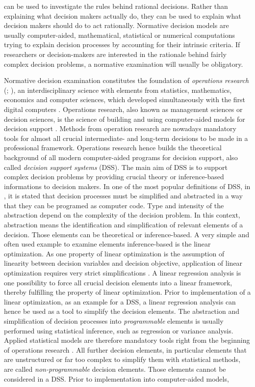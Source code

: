 can be used to investigate the rules behind rational decisions. Rather than explaining what decision makers actually do, they can be used to explain what decision makers should do to act rationally. Normative decision models are usually computer-aided, mathematical, statistical or numerical computations trying to explain decision processes by accounting for their intrinsic criteria. If researchers or decision-makers are interested in the rationale behind fairly complex decision problems, a normative examination will usually be obligatory.

Normative decision examination constitutes the foundation of \textit{operations research} (\citealp[p. 112]{shim_2002}; \citealp[p. 498]{simon_1979}), an interdisciplinary science with elements from statistics, mathematics, economics and computer sciences, which developed simultaneously with the first digital computers \citep{churchman_1957}. Operations research, also known as management sciences or decision sciences, is the science of building and using computer-aided models for decision support \citep[p. 373-374]{wacker_1998}. Methods from operation research are nowadays mandatory tools for almost all crucial intermediate- and long-term decisions to be made in a professional framework. Operations research hence builds the theoretical background of all modern computer-aided programs for decision support, also called \textit{decision support systems} (DSS). The main aim of DSS is to support complex decision problems by providing crucial theory or inference-based informations to decision makers. In one of the most popular definitions of DSS, in \citet[p. 26]{gorry_1971}, it is stated that decision processes must be simplified and abstracted in a way that they can be programed as computer code. Type and intensity of the abstraction depend on the complexity of the decision problem. In this context, abstraction means the identification and simplification of relevant elements of a decision. Those elements can be theoretical or inference-based. A very simple and often used example to examine elements inference-based is the linear optimization. As one property of linear optimization is the assumption of linearity between decision variables and decision objective, application of linear optimization requires very strict simplifications \citep[p. 129]{kangas_2015}. A linear regression analysis is one possibility to force all crucial decision elements into a linear framework, thereby fulfilling the property of linear optimization. Prior to implementation of a linear optimization, as an example for a DSS, a linear regression analysis can hence be used as a tool to simplify the decision elements. The abstraction and simplification of decision processes into \textit{programmable} elements is usually performed using statistical inference, such as regression or variance analysis. Applied statistical models are therefore mandatory tools right from the beginning of operations research \citep{churchman_1957}. All further decision elements, in particular elements that are unstructured or far too complex to simplify them with statistical methods, are called \textit{non-programmable} decision elements. Those elements cannot be considered in a DSS. Prior to implementation into computer-aided models, 